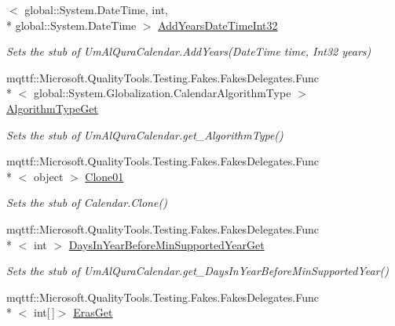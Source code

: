 \begin{DoxyCompactItemize}
$<$ global\-::\-System.\-Date\-Time, int, \\*
global\-::\-System.\-Date\-Time $>$ \hyperlink{class_system_1_1_globalization_1_1_fakes_1_1_stub_um_al_qura_calendar_a87c835fe69981e4082c88a7ac7fee45e}{Add\-Years\-Date\-Time\-Int32}
\begin{DoxyCompactList}\small\item\em Sets the stub of Um\-Al\-Qura\-Calendar.\-Add\-Years(\-Date\-Time time, Int32 years)\end{DoxyCompactList}\item 
mqttf\-::\-Microsoft.\-Quality\-Tools.\-Testing.\-Fakes.\-Fakes\-Delegates.\-Func\\*
$<$ global\-::\-System.\-Globalization.\-Calendar\-Algorithm\-Type $>$ \hyperlink{class_system_1_1_globalization_1_1_fakes_1_1_stub_um_al_qura_calendar_ab4d13738a69f628e09f896d8b055abce}{Algorithm\-Type\-Get}
\begin{DoxyCompactList}\small\item\em Sets the stub of Um\-Al\-Qura\-Calendar.\-get\-\_\-\-Algorithm\-Type()\end{DoxyCompactList}\item 
mqttf\-::\-Microsoft.\-Quality\-Tools.\-Testing.\-Fakes.\-Fakes\-Delegates.\-Func\\*
$<$ object $>$ \hyperlink{class_system_1_1_globalization_1_1_fakes_1_1_stub_um_al_qura_calendar_ab2c4be894ca8c30a01cbf87747a7c434}{Clone01}
\begin{DoxyCompactList}\small\item\em Sets the stub of Calendar.\-Clone()\end{DoxyCompactList}\item 
mqttf\-::\-Microsoft.\-Quality\-Tools.\-Testing.\-Fakes.\-Fakes\-Delegates.\-Func\\*
$<$ int $>$ \hyperlink{class_system_1_1_globalization_1_1_fakes_1_1_stub_um_al_qura_calendar_aa1a6e7733439d7adab5e67e5119ca82f}{Days\-In\-Year\-Before\-Min\-Supported\-Year\-Get}
\begin{DoxyCompactList}\small\item\em Sets the stub of Um\-Al\-Qura\-Calendar.\-get\-\_\-\-Days\-In\-Year\-Before\-Min\-Supported\-Year()\end{DoxyCompactList}\item 
mqttf\-::\-Microsoft.\-Quality\-Tools.\-Testing.\-Fakes.\-Fakes\-Delegates.\-Func\\*
$<$ int\mbox{[}$\,$\mbox{]}$>$ \hyperlink{class_system_1_1_globalization_1_1_fakes_1_1_stub_um_al_qura_calendar_a0d0c69c9a22c7921e607cc45d9e95cb9}{Eras\-Get}

\end{DoxyCompactItemize}
